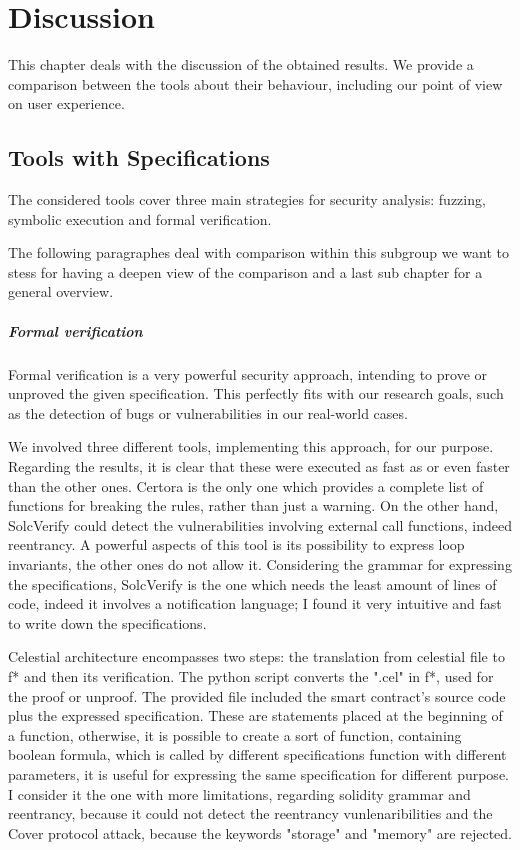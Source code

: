 \chapter{Discussion}
\label{ch:Discussionn}

This chapter deals with the discussion of the obtained results. 
We provide a comparison between the tools about their behaviour, including our point of view on user experience. 
\section{Tools with Specifications}
The considered tools cover three main strategies for security analysis: fuzzing, symbolic execution and formal verification. 

The following paragraphes deal with comparison within this subgroup we want to stess for having a deepen view of the comparison and a last sub chapter for a general overview.

\paragraph{Formal verification} 
Formal verification is a very powerful security approach, intending to prove or unproved the given specification. 
This perfectly fits with our research goals, such as the detection of bugs or vulnerabilities in our real-world cases. 

We involved three different tools, implementing this approach, for our purpose. Regarding the results, it is clear that these were executed as fast as or even faster than the other ones. 
Certora is the only one which provides a complete list of functions for breaking the rules, rather than just a warning. 
On the other hand, SolcVerify could detect the vulnerabilities involving external call functions, indeed reentrancy. A powerful aspects of this tool is its possibility to express 
loop invariants, the other ones do not allow it.
Considering the grammar for expressing the specifications, SolcVerify is the one which needs the least amount of lines of code, indeed it involves a notification language; 
I found it very intuitive and fast to write down the specifications.

Celestial architecture encompasses two steps: the translation from celestial file to f* and then its verification. The python script converts the ".cel" in f*, used for the proof or unproof.
The provided file included the smart contract's source code plus the expressed specification. These are statements placed at the beginning of a function, otherwise, it is possible to create a sort of function, 
containing boolean formula, which is called by different specifications function with different parameters, it is useful for expressing the same specification for different purpose.  I consider it the one with more limitations, regarding solidity grammar and reentrancy, 
because it could not detect the reentrancy vunlenaribilities and the Cover protocol attack, because the keywords "storage" and "memory" are rejected. 

